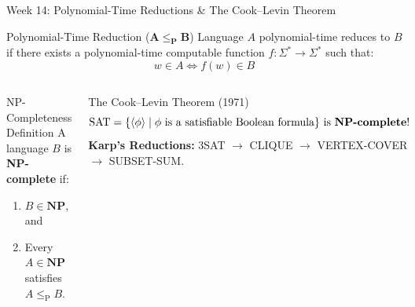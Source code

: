 \documentclass[aspectratio=169,10pt]{beamer}
\begin{document}
\begin{frame}{Week 14: Polynomial-Time Reductions \& The Cook--Levin Theorem}
    \begin{block}{Polynomial-Time Reduction ($\mathbf{A \le_{\text{P}} B}$)}
        Language $A$ polynomial-time reduces to $B$ if there exists a polynomial-time computable function $f: \Sigma^* \to \Sigma^*$ such that:
        $$w \in A \iff f(w) \in B$$
    \end{block}
    
    \begin{columns}[T]
        \begin{alertblock}{NP-Completeness Definition}
            A language $B$ is \textbf{NP-complete} if:
            \begin{enumerate}
                \item $B \in \mathbf{NP}$, and
                \item Every $A \in \mathbf{NP}$ satisfies $A \le_{\text{P}} B$.
            \end{enumerate}
        \end{alertblock}
        
        \begin{exampleblock}{The Cook--Levin Theorem (1971)}
            $$\text{SAT} = \{\langle \phi \rangle \mid \phi \text{ is a satisfiable Boolean formula}\} \text{ is \textbf{NP-complete}!}$$
            \textbf{Karp's Reductions:} 3SAT $\to$ CLIQUE $\to$ VERTEX-COVER $\to$ SUBSET-SUM.
        \end{exampleblock}
    \end{columns}
\end{frame}
\end{document}
